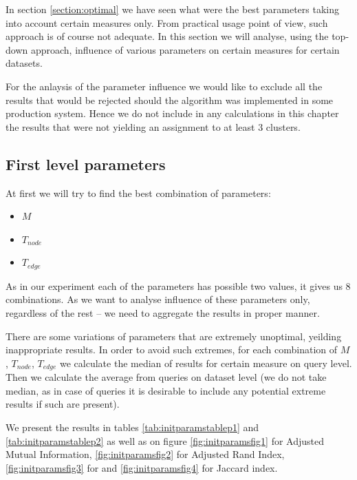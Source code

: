 \documentclass[a4paper, 12pt, oneside]{Thesis} %
\begin{document}
In section \ref{section:optimal} we have seen what were the best parameters taking into account certain measures only. From practical usage point of view, such approach is of course not adequate. In this section we will analyse, using the top-down approach, influence of various parameters on certain measures for certain datasets.

For the anlaysis of the parameter influence we would like to exclude all the results that would be rejected should the algorithm was implemented in some production system. Hence we do not include in any calculations in this chapter the results that were not yielding an assignment to at least 3 clusters.

\subsection{First level parameters}

At first we will try to find the best combination of parameters:
\begin{itemize}
    \item $M$
    \item $T_{node}$
    \item $T_{edge}$
\end{itemize}

As in our experiment each of the parameters has possible two values, it gives us 8 combinations. As we want to analyse influence of these parameters only, regardless of the rest -- we need to aggregate the results in proper manner.

There are some variations of parameters that are extremely unoptimal, yeilding inappropriate results. In order to avoid such extremes, for each combination of $M$, $T_{node}$, $T_{edge}$ we calculate the median of results for certain measure on query level. Then we calculate the average from queries on dataset level (we do not take median, as in case of queries it is desirable to include any potential extreme results if such are present).

We present the results in tables \ref{tab:initparamstablep1} and \ref{tab:initparamstablep2} as well as on figure \ref{fig:initparamsfig1} for Adjusted Mutual Information, \ref{fig:initparamsfig2} for Adjusted Rand Index, \ref{fig:initparamsfig3} for  and \ref{fig:initparamsfig4} for Jaccard index.
\end{document}
